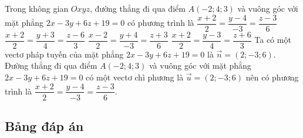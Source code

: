 \begin{ex}%
	Trong không gian $O x y z$, đường thẳng đi qua điểm $A(-2;4;3)$ và vuông góc với mặt phẳng $2x-3y+6z+19=0$ có phương trình là 
	\choice 
	{\True $\dfrac{x+2}{2}=\dfrac{y-4}{-3}=\dfrac{z-3}{6}$}
	{$\dfrac{x+2}{2}=\dfrac{y+3}{4}=\dfrac{z-6}{3}$}
	{$\dfrac{x-2}{2}=\dfrac{y+4}{-3}=\dfrac{z+3}{6}$}
	{$\dfrac{x+2}{2}=\dfrac{y-3}{4}=\dfrac{z+6}{3}$}
	\loigiai 
	{
Ta có một vectơ pháp tuyến của mặt phẳng $2x-3y+6z+19=0$ là $\vec{n}=(2;-3;6)$.\\
Đường thẳng đi qua điểm $A(-2;4;3)$ và vuông góc với mặt phẳng $2x-3y+6z+19=0$ có một vectơ chì phương là $\vec{u}=(2;-3;6)$ nên có phương trình là $\dfrac{x+2}{2}=\dfrac{y-4}{-3}=\dfrac{z-3}{6}$.	
	}
\end{ex}
\subsection{Bảng đáp án}


